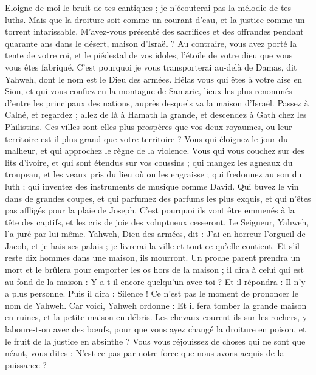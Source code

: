 \begin{multicols}{2}
Eloigne de moi le bruit de tes cantiques ; je n’écouterai pas la mélodie de tes luths.
Mais que la droiture soit comme un courant d’eau, et la justice comme un torrent intarissable.
M’avez-vous présenté des sacrifices et des offrandes pendant quarante ans dans le désert, maison d'Israël ?
Au contraire, vous avez porté la tente de votre roi, et le piédestal de vos idoles, l'étoile de votre dieu que vous vous êtes fabriqué.
C'est pourquoi je vous transporterai au-delà de Damas, dit Yahweh, dont le nom est le Dieu des armées.
\VerseOne{}Hélas vous qui êtes à votre aise en Sion, et qui vous confiez en la montagne de Samarie, lieux les plus renommés d’entre les principaux des nations, auprès desquels va la maison d'Israël.
Passez à Calné, et regardez ; allez de là à Hamath la grande, et descendez à Gath chez les Philistins. Ces villes sont-elles plus prospères que vos deux royaumes, ou leur territoire est-il plus grand que votre territoire ?
Vous qui éloignez le jour du malheur, et qui approchez le règne de la violence.
Vous qui vous couchez sur des lits d'ivoire, et qui sont étendus sur vos coussins ; qui mangez les agneaux du troupeau, et les veaux pris du lieu où on les engraisse ;
qui fredonnez au son du luth ; qui inventez des instruments de musique comme David.
Qui buvez le vin dans de grandes coupes, et qui parfumez des parfums les plus exquis, et qui n’êtes pas affligés pour la plaie de Joseph.
C’est pourquoi ils vont être emmenés à la tête des captifs, et les cris de joie des voluptueux cesseront.
Le Seigneur, Yahweh, l’a juré par lui-même. Yahweh, Dieu des armées, dit : J'ai en horreur l'orgueil de Jacob, et je hais ses palais ; je livrerai la ville et tout ce qu’elle contient.
Et s'il reste dix hommes dans une maison, ils mourront.
Un proche parent prendra un mort et le brûlera pour emporter les os hors de la maison ; il dira à celui qui est au fond de la maison : Y a-t-il encore quelqu'un avec toi ? Et il répondra : Il n’y a plus personne. Puis il dira : Silence ! Ce n’est pas le moment de prononcer le nom de Yahweh.
Car voici, Yahweh ordonne : Et il fera tomber la grande maison en ruines, et la petite maison en débris.
Les chevaux courent-ils sur les rochers, y laboure-t-on avec des bœufs, pour que vous ayez changé la droiture en poison, et le fruit de la justice en absinthe ?
Vous vous réjouissez de choses qui ne sont que néant, vous dites : N’est-ce pas par notre force que nous avons acquis de la puissance ?

\end{multicols}
